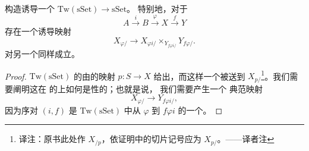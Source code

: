 \begin{lemma}\label{lem:slice-functorial}
\trSlice{}构造诱导一个\trFunctor{} $\mathrm{Tw}(\mathrm{sSet}) \to \mathrm{sSet}$。
特别地，对于
\[
A \xrightarrow{\ i\ } B \xrightarrow{\ \varphi\ } X
\xrightarrow{\ f\ } Y
\]
存在一个诱导映射
\[
X_{\varphi/} \to X_{\varphi i/} \times_{Y_{f \varphi i/}} Y_{f \varphi/}.
\]
对另一个\trSlice{}同样成立。
\end{lemma}

\begin{proof}
$\mathrm{Tw}(\mathrm{sSet})$ 的\trObject{}由\trSimplicialSets{}的映射
$p\colon S \to X$ 给出，而这样一个\trObject{}被送到 $X_{p/}$\footnote{译注：原书此处作 $X_{/p}$，依证明中的切片记号应为 $X_{p/}$。——译者注}。我们需要阐明这在%
\trTwistedArrowCategory{}的\trMorphism{}上如何是\trFunctor{}性的；也就是说，
我们需要产生一个
典范映射
\[
X_{\varphi/} \to Y_{f \varphi i/},
\]
因为序对 $(i, f)$ 是 $\mathrm{Tw}(\mathrm{sSet})$ 中从 $\varphi$ 到
$f \varphi i$ 的一个\trMorphism{}。


\end{proof}
